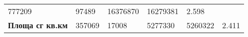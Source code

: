 \documentclass[
]{article}
\begin{document}
\begin{longtable}[]{@{}llllll@{}}
\begin{minipage}[t]{0.13\columnwidth}
777209\strut
\end{minipage} & \begin{minipage}[t]{0.13\columnwidth}\raggedright
97489\strut
\end{minipage} & \begin{minipage}[t]{0.14\columnwidth}\raggedright
16376870\strut
\end{minipage} & \begin{minipage}[t]{0.14\columnwidth}\raggedright
16279381\strut
\end{minipage} & \begin{minipage}[t]{0.10\columnwidth}\raggedright
2.598\strut
\end{minipage}\tabularnewline
\begin{minipage}[t]{0.19\columnwidth}\raggedright
\textbf{Площа сг кв.км}\strut
\end{minipage} & \begin{minipage}[t]{0.13\columnwidth}\raggedright
357069\strut
\end{minipage} & \begin{minipage}[t]{0.13\columnwidth}\raggedright
17008\strut
\end{minipage} & \begin{minipage}[t]{0.14\columnwidth}\raggedright
5277330\strut
\end{minipage} & \begin{minipage}[t]{0.14\columnwidth}\raggedright
5260322\strut
\end{minipage} & \begin{minipage}[t]{0.10\columnwidth}\raggedright
2.411\strut
\end{minipage}\tabularnewline
\bottomrule
\end{longtable}
\end{document}
